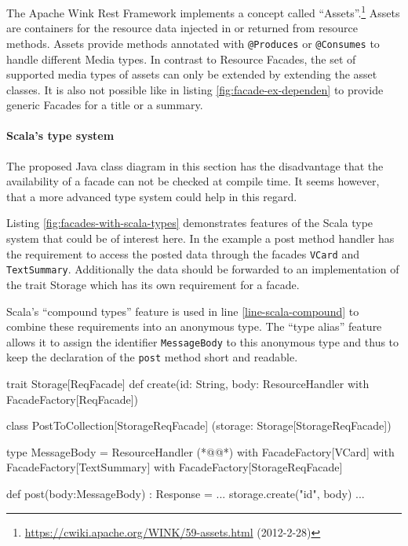 \documentclass[12pt,a4paper,twoside]{scrartcl}		%
\newcommand{\citeurl}[2]{\url{#1} (#2)}
\begin{document}
The Apache Wink Rest Framework implements a concept called
``Assets''.\footnote{\citeurl{https://cwiki.apache.org/WINK/59-assets.html}{2012-2-28}}
Assets are containers for the resource data injected in or returned from
resource methods. Assets provide methods annotated with \lstinline:@Produces: or
\lstinline:@Consumes: to handle different Media types. In contrast to Resource
Facades, the set of supported media types of assets can only be extended by
extending the asset classes. It is also not possible like in listing
\ref{fig:facade-ex-dependen} to provide generic Facades for a title or a
summary.

\paragraph{Scala's type system}
The proposed Java class diagram in this section has the disadvantage that the
availability of a facade can not be checked at compile time. It seems however,
that a more advanced type system could help in this regard.

Listing \ref{fig:facades-with-scala-types} demonstrates features of the Scala
type system\cite{Odersky2011} that could be of interest here. In the example a
post method handler has the requirement to access the posted data through the
facades \lstinline:VCard: and \lstinline:TextSummary:. Additionally the data
should be forwarded to an implementation of the trait Storage which has its own
requirement for a facade.

Scala's ``compound types'' feature is used in line \ref{line-scala-compound} to
combine these requirements into an anonymous type. The ``type alias'' feature
allows it to assign the identifier \lstinline:MessageBody: to this anonymous
type and thus to keep the declaration of the \lstinline:post: method short and
readable.

\begin{javalisting}[label=fig:facades-with-scala-types,
                   numbers=left,
                   escapeinside={(*@}{@*)},
                   caption={Implementing the facades approach with Scala's type system}]
trait Storage[ReqFacade] {
 def create(id: String,
            body: ResourceHandler with FacadeFactory[ReqFacade])
}

class PostToCollection[StorageReqFacade]
            (storage: Storage[StorageReqFacade]) {
 type MessageBody = ResourceHandler (*@\label{line-scala-compound}@*)
                      with FacadeFactory[VCard] 
                      with FacadeFactory[TextSummary]
                      with FacadeFactory[StorageReqFacade]
  
 def post(body:MessageBody) : Response = {
  ...
  storage.create("id", body)
  ...
 }
}
\end{javalisting}
\end{document}
